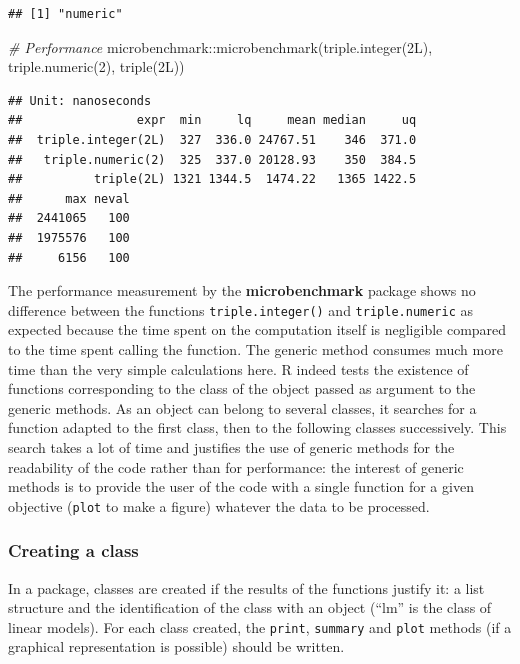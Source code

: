 \documentclass[
  12pt,
  american,
  a4paper,
  extrafontsizes,onecolumn,openright
  ]{memoir}
\newenvironment{Shaded}{\begin{snugshade}}{\end{snugshade}}
\newcommand{\CommentTok}[1]{\textcolor[rgb]{0.56,0.35,0.01}{\textit{#1}}}
\newcommand{\DecValTok}[1]{\textcolor[rgb]{0.00,0.00,0.81}{#1}}
\newcommand{\FunctionTok}[1]{\textcolor[rgb]{0.00,0.00,0.00}{#1}}
\newcommand{\NormalTok}[1]{#1}
\newcommand{\SpecialCharTok}[1]{\textcolor[rgb]{0.00,0.00,0.00}{#1}}
\newlength{\rf}
\begin{document}
\begin{verbatim}
## [1] "numeric"
\end{verbatim}

\begin{Shaded}
\begin{Highlighting}[]
\CommentTok{\# Performance}
\NormalTok{microbenchmark}\SpecialCharTok{::}\FunctionTok{microbenchmark}\NormalTok{(}\FunctionTok{triple.integer}\NormalTok{(2L), }\FunctionTok{triple.numeric}\NormalTok{(}\DecValTok{2}\NormalTok{),}
    \FunctionTok{triple}\NormalTok{(2L))}
\end{Highlighting}
\end{Shaded}

\begin{verbatim}
## Unit: nanoseconds
##                expr  min     lq     mean median     uq
##  triple.integer(2L)  327  336.0 24767.51    346  371.0
##   triple.numeric(2)  325  337.0 20128.93    350  384.5
##          triple(2L) 1321 1344.5  1474.22   1365 1422.5
##      max neval
##  2441065   100
##  1975576   100
##     6156   100
\end{verbatim}

\normalsize

The performance measurement by the \textbf{microbenchmark} package shows no difference between the functions \texttt{triple.integer()} and \texttt{triple.numeric} as expected because the time spent on the computation itself is negligible compared to the time spent calling the function.
The generic method consumes much more time than the very simple calculations here.
R indeed tests the existence of functions corresponding to the class of the object passed as argument to the generic methods.
As an object can belong to several classes, it searches for a function adapted to the first class, then to the following classes successively.
This search takes a lot of time and justifies the use of generic methods for the readability of the code rather than for performance: the interest of generic methods is to provide the user of the code with a single function for a given objective (\texttt{plot} to make a figure) whatever the data to be processed.

\hypertarget{creating-a-class}{%
\subsubsection{Creating a class}\label{creating-a-class}}

In a package, classes are created if the results of the functions justify it: a list structure and the identification of the class with an object (\enquote{lm} is the class of linear models).
For each class created, the \texttt{print}, \texttt{summary} and \texttt{plot} methods (if a graphical representation is possible) should be written.
\end{document}

